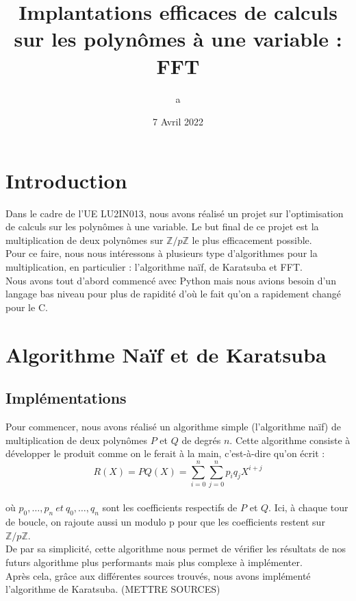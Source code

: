 \documentclass[12pt, a4paper]{article}
\title{Implantations efficaces de calculs sur les polynômes à une variable : FFT}
\author{a}
\date{7 Avril 2022}
\begin{document}
\maketitle
\tableofcontents
\newpage

\section*{Introduction}
Dans le cadre de l'UE LU2IN013, nous avons réalisé un projet sur l'optimisation de calculs sur les polynômes à une variable. Le but final de ce projet est la multiplication de deux polynômes sur $\mathbb{Z}/p\mathbb{Z}$ le plus efficacement possible.\\
Pour ce faire, nous nous intéressons à plusieurs type d'algorithmes pour la multiplication, en particulier : l'algorithme naïf, de Karatsuba et FFT.\\
Nous avons tout d'abord commencé avec Python mais nous avions besoin d'un langage bas niveau pour plus de rapidité d'où le fait qu'on a rapidement changé pour le C.

\section{Algorithme Naïf et de Karatsuba}
\subsection{Implémentations}

Pour commencer, nous avons réalisé un algorithme simple (l'algorithme naïf) de multiplication de deux polynômes $P$ et $Q$ de degrés $n$. Cette algorithme consiste à développer le produit comme on le ferait à la main, c'est-à-dire qu'on écrit : \\
\[R(X) = PQ(X) =
\displaystyle\sum_{i=0}^{n}\sum_{j=0}^{n} p_i q_j X^{i+j}\] \\
où $p_0,\dots,p_n\ et\ q_0,\dots,q_n$ sont les coefficients respectifs de $P$ et $Q$. Ici, à chaque tour de boucle, on rajoute aussi un modulo p pour que les coefficients restent sur $\mathbb{Z}/p\mathbb{Z}$.\\
De par sa simplicité, cette algorithme nous permet de vérifier les résultats de nos futurs algorithme plus performants mais plus complexe à implémenter.\\
Après cela, grâce aux différentes sources 
trouvés, nous avons implémenté l'algorithme de Karatsuba. (METTRE SOURCES)
\end{document}
